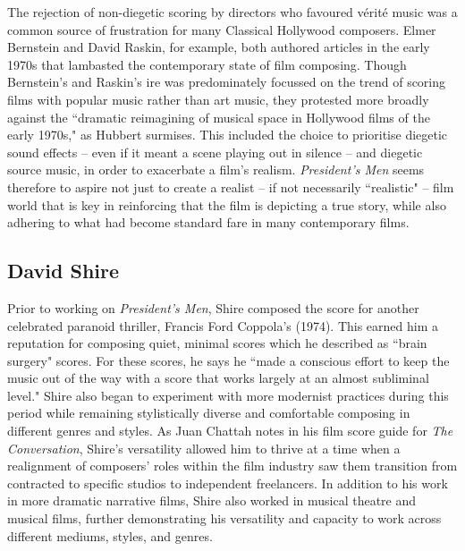 The rejection of non-diegetic scoring by directors who favoured vérité music was a common source of frustration for many Classical Hollywood composers.
Elmer Bernstein and David Raskin, for example, both authored articles in the early 1970s that lambasted the contemporary state of film composing.
Though Bernstein's and Raskin's ire was predominately focussed on the trend of scoring films with popular music rather than art music, they protested more broadly against the ``dramatic reimagining of musical space in Hollywood films of the early 1970s," as Hubbert surmises.\autocites[][207]{hubbert_whatever_2003}
This included the choice to prioritise diegetic sound effects – even if it meant a scene playing out in silence – and diegetic source music, in order to exacerbate a film's realism.
\textit{President's Men} seems therefore to aspire not just to create a realist – if not necessarily ``realistic" – film world that is key in reinforcing that the film is depicting a true story, while also adhering to what had become standard fare in many contemporary films.



\subsection{David Shire}

Prior to working on \textit{President's Men}, Shire composed the score for another celebrated paranoid thriller, Francis Ford Coppola's  (1974). 
This earned him a reputation for composing quiet, minimal scores which he described as ``brain surgery" scores.\autocites[][18]{chattah_david_2015}[David Shire, quoted in][]{budinger_interview_1995}
For these scores, he says he ``made a conscious effort to keep the music out of the way with a score that works largely at an almost subliminal level."\autocites[][18]{chattah_david_2015}
Shire also began to experiment with more modernist practices during this period while remaining stylistically diverse and comfortable composing in different genres and styles.
As Juan Chattah notes in his film score guide for \textit{The Conversation}, Shire's versatility allowed him to thrive at a time when a realignment of composers' roles within the film industry saw them transition from contracted to specific studios to independent freelancers.\autocites[][23]{chattah_david_2015}[Caryl Flinn also discusses this shift in composer contracts, and I will explore this in more detail in the following chapter during my analysis of \textit{Alien}.][]{flinn_strains_1992}
In addition to his work in more dramatic narrative films, Shire also worked in musical theatre and musical films, further demonstrating his versatility and capacity to work across different mediums, styles, and genres.

